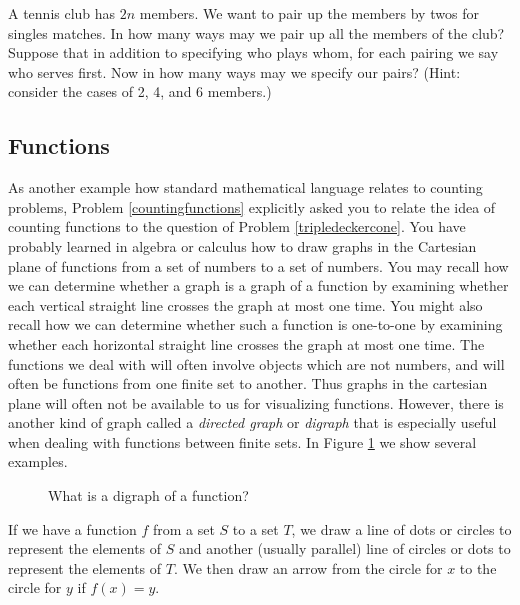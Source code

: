 \itemi A tennis club has $2n$ members.  We want to pair up the
members by twos for singles matches.  In how many ways may we pair up all the
members of the club?  Suppose that in addition to specifying who plays whom,
for each pairing we say who serves first.  Now in how many ways may we
specify our pairs?\label{tennispairings1}  (Hint: consider the cases of 2, 4,
and 6 members.)
\ep

\subsection{Functions} As another example how standard mathematical language
relates to counting problems, Problem \ref{countingfunctions} explicitly asked
you to relate the idea of counting functions to the question of
Problem \ref{tripledeckercone}.
  You have probably learned in algebra or calculus how to draw graphs in the
Cartesian plane of functions from a set of numbers to a set of numbers.  You
may recall how we can determine whether a graph is a graph of a function by
examining whether each vertical straight line crosses the graph at most one
time.  You might also recall how we can determine whether such a function is
one-to-one by examining whether each horizontal straight line crosses the
graph at most one time.  The functions we deal with will often involve
objects which are not numbers, and will often be functions from one finite
set to another.  Thus graphs in the cartesian plane will often not be
available to us for visualizing functions.  However, there is another kind of
graph called a
{\em directed graph} or
{\em digraph} that is especially useful
when dealing with functions between finite sets.  In Figure
\ref{functiondigraphs} we show several examples.
\begin{figure}[hbt]\caption{What is a digraph of a
function?}\label{functiondigraphs}\smallskip
\begin{center}\end{center}
\end{figure}
 If we have a function
$f$ from a set
$S$ to a set $T$, we draw a line of dots or circles to represent the elements
of
$S$ and another (usually parallel) line of circles or dots to represent the
elements of
$T$.  We then draw an arrow from the circle for $x$ to the circle for $y$ if
$f(x) = y$.



